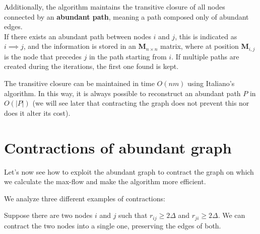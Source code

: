     Additionally, the algorithm maintains the transitive closure of all nodes connected by an \textbf{abundant path}, meaning a path composed only of abundant edges.\\
    If there exists an abundant path between nodes \( i \) and \( j \), this is indicated as \( i \implies j \), and the information is stored in an \textbf{M}$_{n \times n}$ matrix, where at position \textbf{M}$_{i,j}$ is the node that precedes \( j \) in the path starting from \( i \). If multiple paths are created during the iterations, the first one found is kept.

    The transitive closure can be maintained in time \( O(nm) \) using Italiano's algorithm\cite{ITALIANO1986273}. 
    In this way, it is always possible to reconstruct an abundant path \( P \) in \( O(|P|) \) (we will see later that contracting the graph does not prevent this nor does it alter its cost).

\newpage
\section{Contractions of abundant graph}
Let's now see how to exploit the abundant graph to contract the graph on which we calculate the max-flow and make the algorithm more efficient.

We analyze three different examples of contractions:

Suppose there are two nodes \(i\) and \(j\) such that \(r_{ij} \geq 2\Delta\) and \(r_{ji} \geq 2\Delta\).
We can contract the two nodes into a single one, preserving the edges of both.

